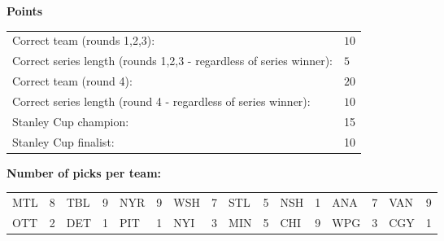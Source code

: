 \documentclass[10pt]{article}
\begin{document}
{\bf Points}\\
\begin{minipage}{12cm}
    \begin{tabular}{l l}
        Correct team (rounds 1,2,3):	& $10$\\
        Correct series length (rounds 1,2,3 - regardless of series winner):	& $5$\\
        Correct team (round 4):	& $20$\\
        Correct series length (round 4 - regardless of series winner):	& $10$\\
        Stanley Cup champion:	& 15\\
        Stanley Cup finalist:	& 10\\
    \end{tabular}

    \vspace{1cm}
    {\bf Number of picks per team:}\\
    \begin{tabular}{lc | lc | lc | lc | lc | lc | lc | lc }
        MTL & 8 & TBL & 9 & NYR & 9 & WSH & 7 & STL & 5 & NSH & 1 & ANA & 7 & VAN & 9 \\
        OTT & 2 & DET & 1 & PIT & 1 & NYI & 3 & MIN & 5 & CHI & 9 & WPG & 3 & CGY & 1 \\
    \end{tabular}
\end{minipage}
\end{document}
